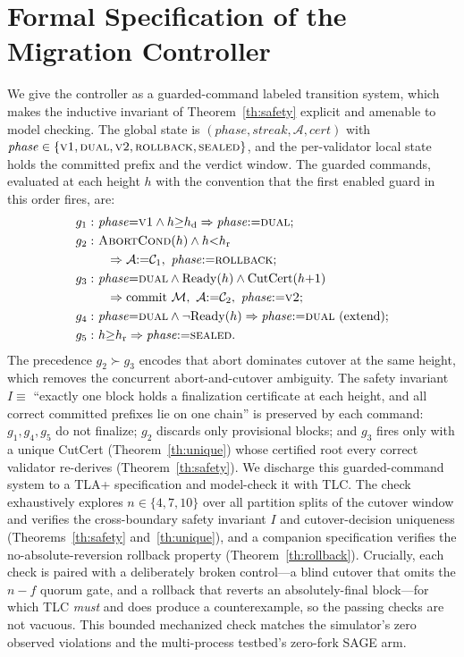 \documentclass[journal]{IEEEtran}
\begin{document}
\section{Formal Specification of the Migration Controller}
\label{app:spec}
We give the controller as a guarded-command labeled transition system, which makes the
inductive invariant of Theorem~\ref{th:safety} explicit and amenable to model checking. The
global state is $(\mathit{phase}, \mathit{streak}, \mathcal{A}, \mathit{cert})$ with
$\mathit{phase}\in\{\textsc{v1},\textsc{dual},\textsc{v2},\textsc{rollback},\textsc{sealed}\}$,
and the per-validator local state holds the committed prefix and the verdict window. The
guarded commands, evaluated at each height $h$ with the convention that the first enabled guard
in this order fires, are:
\begin{align*}
g_1:&\ \mathit{phase}{=}\textsc{v1}\wedge h{\ge}h_{\mathrm{d}} \Rightarrow \mathit{phase}{:=}\textsc{dual};\\
g_2:&\ \textsc{AbortCond}(h)\wedge h{<}h_{\mathrm{r}}\\
    &\quad \Rightarrow \mathcal{A}{:=}\mathcal{C}_1,\ \mathit{phase}{:=}\textsc{rollback};\\
g_3:&\ \mathit{phase}{=}\textsc{dual}\wedge\mathrm{Ready}(h)\wedge\mathrm{CutCert}(h{+}1)\\
    &\quad \Rightarrow \text{commit }\mathcal{M},\ \mathcal{A}{:=}\mathcal{C}_2,\ \mathit{phase}{:=}\textsc{v2};\\
g_4:&\ \mathit{phase}{=}\textsc{dual}\wedge\neg\mathrm{Ready}(h) \Rightarrow \mathit{phase}{:=}\textsc{dual}\ (\text{extend});\\
g_5:&\ h{\ge}h_{\mathrm{r}} \Rightarrow \mathit{phase}{:=}\textsc{sealed}.
\end{align*}
The precedence $g_2 \succ g_3$ encodes that abort dominates cutover at the same height, which
removes the concurrent abort-and-cutover ambiguity. The safety invariant
$I \equiv$ ``exactly one block holds a finalization certificate at each height, and all correct
committed prefixes lie on one chain'' is preserved by each command: $g_1,g_4,g_5$ do not
finalize; $g_2$ discards only provisional blocks; and $g_3$ fires only with a unique CutCert
(Theorem~\ref{th:unique}) whose certified root every correct validator re-derives
(Theorem~\ref{th:safety}). We discharge this guarded-command system to a TLA+ specification and
model-check it with TLC. The check exhaustively explores $n\in\{4,7,10\}$ over all partition splits of the
cutover window and verifies the cross-boundary safety invariant $I$ and cutover-decision
uniqueness (Theorems~\ref{th:safety} and~\ref{th:unique}), and a companion specification verifies
the no-absolute-reversion rollback property (Theorem~\ref{th:rollback}). Crucially, each check is
paired with a deliberately broken control---a blind cutover that omits the $n-f$ quorum gate, and
a rollback that reverts an absolutely-final block---for which TLC \emph{must} and does produce a
counterexample, so the passing checks are not vacuous. This bounded mechanized check matches the
simulator's zero observed violations and the multi-process testbed's zero-fork SAGE arm.
\end{document}
